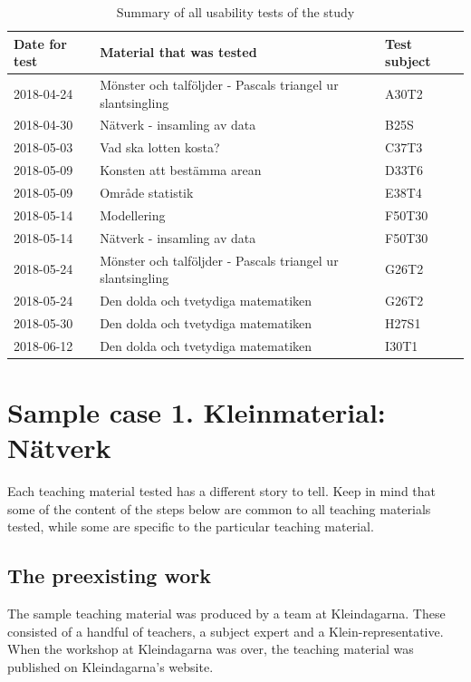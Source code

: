\begin{table}[H]
\centering
\caption{Summary of all usability tests of the study}
\begin{tabular}{lll} \hline\hline
  Date for test & Material that was tested & Test subject \\ \hline
  2018-04-24 & Mönster och talföljder - Pascals triangel ur slantsingling & A30T2 \\ \hline
  2018-04-30 & Nätverk - insamling av data & B25S \\ \hline
  2018-05-03 & Vad ska lotten kosta? & C37T3 \\ \hline
  2018-05-09 & Konsten att bestämma arean & D33T6 \\ \hline
  2018-05-09 & Område statistik & E38T4 \\ \hline
  2018-05-14 & Modellering & F50T30 \\ \hline
  2018-05-14 & Nätverk - insamling av data & F50T30 \\ \hline
  2018-05-24 & Mönster och talföljder - Pascals triangel ur slantsingling & G26T2 \\ \hline
  2018-05-24 & Den dolda och tvetydiga matematiken & G26T2 \\ \hline
  2018-05-30 & Den dolda och tvetydiga matematiken & H27S1 \\ \hline
  2018-06-12 & Den dolda och tvetydiga matematiken & I30T1
  \\ \hline\hline
\end{tabular}
\end{table}

\section{Sample case 1. Kleinmaterial: Nätverk}
Each teaching material tested has a different story to tell. Keep in mind that some of the content of the steps below are common to all teaching materials tested, while some are specific to the particular teaching material.

\subsection{The preexisting work}
The sample teaching material was produced by a team at Kleindagarna. These consisted of a handful of teachers, a subject expert and a Klein-representative. When the workshop at Kleindagarna was over, the teaching material was published on Kleindagarna's website. 

